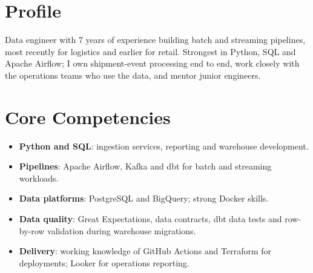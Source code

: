 \documentclass[11pt,a4paper,sans]{moderncv}
\begin{document}
\makecvtitle
\section{Profile}
Data engineer with 7 years of experience building batch and streaming pipelines, most recently for logistics and earlier for retail. Strongest in Python, SQL and Apache Airflow; I own shipment-event processing end to end, work closely with the operations teams who use the data, and mentor junior engineers.

\section{Core Competencies}
\begin{itemize}
\item \textbf{Python and SQL}: ingestion services, reporting and warehouse development.
\item \textbf{Pipelines}: Apache Airflow, Kafka and dbt for batch and streaming workloads.
\item \textbf{Data platforms}: PostgreSQL and BigQuery; strong Docker skills.
\item \textbf{Data quality}: Great Expectations, data contracts, dbt data tests and row-by-row validation during warehouse migrations.
\item \textbf{Delivery}: working knowledge of GitHub Actions and Terraform for deployments; Looker for operations reporting.
\end{itemize}
\end{document}

